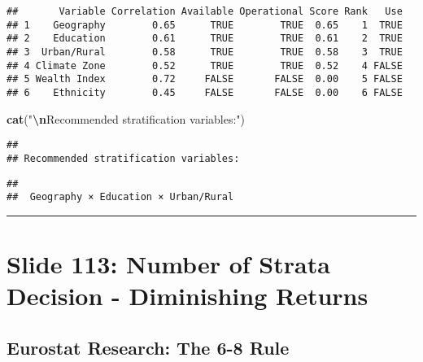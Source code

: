 \documentclass[
]{article}
\newenvironment{Shaded}{\begin{snugshade}}{\end{snugshade}}
\newcommand{\AttributeTok}[1]{\textcolor[rgb]{0.13,0.29,0.53}{#1}}
\newcommand{\FunctionTok}[1]{\textcolor[rgb]{0.13,0.29,0.53}{\textbf{#1}}}
\newcommand{\NormalTok}[1]{#1}
\newcommand{\SpecialCharTok}[1]{\textcolor[rgb]{0.81,0.36,0.00}{\textbf{#1}}}
\newcommand{\StringTok}[1]{\textcolor[rgb]{0.31,0.60,0.02}{#1}}
\begin{document}
\begin{verbatim}
##       Variable Correlation Available Operational Score Rank   Use
## 1    Geography        0.65      TRUE        TRUE  0.65    1  TRUE
## 2    Education        0.61      TRUE        TRUE  0.61    2  TRUE
## 3  Urban/Rural        0.58      TRUE        TRUE  0.58    3  TRUE
## 4 Climate Zone        0.52      TRUE        TRUE  0.52    4 FALSE
## 5 Wealth Index        0.72     FALSE       FALSE  0.00    5 FALSE
## 6    Ethnicity        0.45     FALSE       FALSE  0.00    6 FALSE
\end{verbatim}

\begin{Shaded}
\begin{Highlighting}[]
\FunctionTok{cat}\NormalTok{(}\StringTok{"}\SpecialCharTok{\textbackslash{}n}\StringTok{Recommended stratification variables:"}\NormalTok{)}
\end{Highlighting}
\end{Shaded}

\begin{verbatim}
## 
## Recommended stratification variables:
\end{verbatim}

\begin{Shaded}
\end{Shaded}

\begin{verbatim}
## 
##  Geography × Education × Urban/Rural
\end{verbatim}

\begin{center}\rule{0.5\linewidth}{0.5pt}\end{center}

\section{Slide 113: Number of Strata Decision - Diminishing
Returns}\label{slide-113-number-of-strata-decision---diminishing-returns}

\subsection{Eurostat Research: The 6-8
Rule}\label{eurostat-research-the-6-8-rule}
\end{document}
